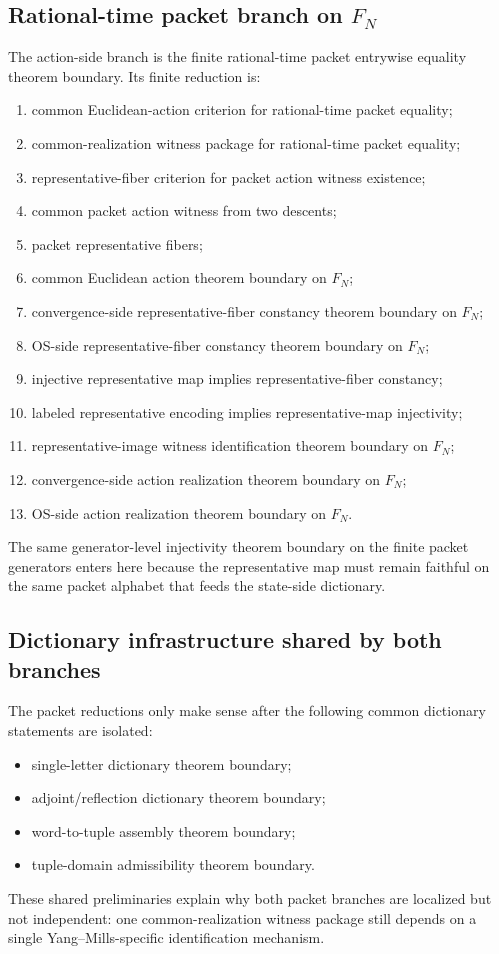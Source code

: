 \subsection*{Rational-time packet branch on $F_N$}
The action-side branch is the finite rational-time packet entrywise equality theorem boundary.
Its finite reduction is:
\begin{enumerate}
\item common Euclidean-action criterion for rational-time packet equality;
\item common-realization witness package for rational-time packet equality;
\item representative-fiber criterion for packet action witness existence;
\item common packet action witness from two descents;
\item packet representative fibers;
\item common Euclidean action theorem boundary on $F_N$;
\item convergence-side representative-fiber constancy theorem boundary on $F_N$;
\item OS-side representative-fiber constancy theorem boundary on $F_N$;
\item injective representative map implies representative-fiber constancy;
\item labeled representative encoding implies representative-map injectivity;
\item representative-image witness identification theorem boundary on $F_N$;
\item convergence-side action realization theorem boundary on $F_N$;
\item OS-side action realization theorem boundary on $F_N$.
\end{enumerate}
The same generator-level injectivity theorem boundary on the finite packet
generators enters here because the representative map must remain faithful on the
same packet alphabet that feeds the state-side dictionary.

\subsection*{Dictionary infrastructure shared by both branches}
The packet reductions only make sense after the following common dictionary
statements are isolated:
\begin{itemize}
\item single-letter dictionary theorem boundary;
\item adjoint/reflection dictionary theorem boundary;
\item word-to-tuple assembly theorem boundary;
\item tuple-domain admissibility theorem boundary.
\end{itemize}
These shared preliminaries explain why both packet branches are localized but not
independent: one common-realization witness package still depends on a single
Yang--Mills-specific identification mechanism.

